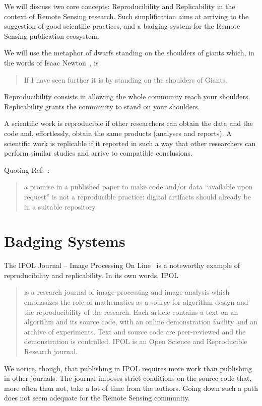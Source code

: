 \documentclass[journal,twoside]{IEEEtran}
\begin{document}
We will discuss two core concepts: Reproducibility and Replicability in the context of Remote Sensing research.
Such simplification aims at arriving to the suggestion of good scientific practices, and a badging system for the Remote Sensing publication ecosystem.

We will use the metaphor of dwarfs standing on the shoulders of giants which, in the words of Isaac Newton~\cite{LetterNewton}, is
\begin{quote}
	If I have seen further it is by standing on the shoulders of Giants.
\end{quote}
Reproducibility consists in allowing the whole community reach your shoulders.
Replicability grants the community to stand on your shoulders.

A scientific work is reproducible if other researchers can obtain the data and the code and, effortlessly, obtain the same products (analyses and reports).
A scientific work is replicable if it reported in such a way that other researchers can perform similar studies and arrive to compatible conclusions.

Quoting Ref.~\cite{PraxisofReproducibleComputationalScience}:
\begin{quote}
	a promise in a published paper
	to make code and/or data ``available upon
	request'' is not a reproducible practice: digital
	artifacts should already be in a suitable repository.
\end{quote}


\section{Badging Systems}

The IPOL Journal -- Image Processing On Line~\cite{IPOL} is a noteworthy example of reproducibility and replicability.
In its own words, IPOL
\begin{quote}
is a research journal of image processing and image analysis which emphasizes the role of mathematics as a source for algorithm design and the reproducibility of the research. Each article contains a text on an algorithm and its source code, with an online demonstration facility and an archive of experiments. Text and source code are peer-reviewed and the demonstration is controlled. IPOL is an Open Science and Reproducible Research journal.
\end{quote}

We notice, though, that publishing in IPOL requires more work than publishing in other journals. 
The journal imposes strict conditions on the source code that, more often than not, take a lot of time from the authors.
Going down such a path does not seem adequate for the Remote Sensing community.
\end{document}

